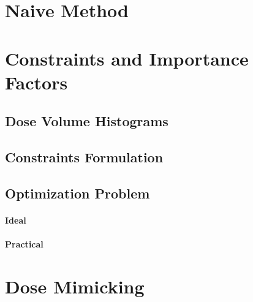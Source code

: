 
\section{Naive Method}
\section{Constraints and Importance Factors}
\subsection[DVHs]{Dose Volume Histograms}
\subsection{Constraints Formulation}
\subsection{Optimization Problem}
\paragraph{Ideal}
\paragraph{Practical}

\section{Dose Mimicking}


